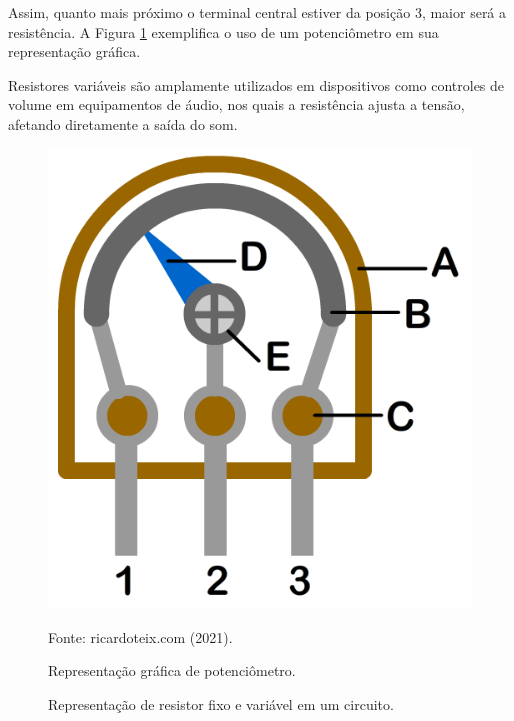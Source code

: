 \documentclass[12pt]{article}
\begin{document}
    Assim, quanto mais próximo o terminal central estiver da posição 3, maior será a resistência. A Figura \ref{fig:potenciometro} exemplifica o uso de um potenciômetro em sua representação gráfica.

    Resistores variáveis são amplamente utilizados em dispositivos como controles de volume em equipamentos de áudio, nos quais a resistência ajusta a tensão, afetando diretamente a saída do som.

    \begin{figure}[H]
        \centering
        \caption{Representação gráfica de potenciômetro.}
        \begin{minipage}{0.4\textwidth}
            \centering
            \includegraphics[width=\textwidth]{external-figures/resistor-variavel.png}
            \raggedright \footnotesize Fonte: ricardoteix.com (2021)\nocite{ricardo_teix}.
            \label{fig:potenciometro}
        \end{minipage}
    \end{figure}

    \begin{figure}[H]
        \centering
        \caption{Representação de resistor fixo e variável em um circuito.}
    \end{figure}
    
\end{document}
